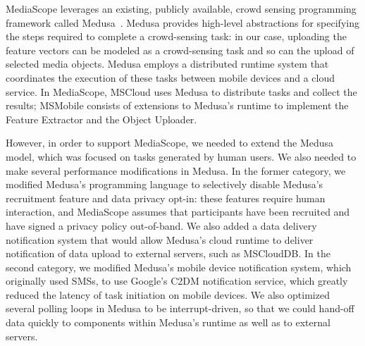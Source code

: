 MediaScope leverages an existing, publicly available, crowd sensing
programming framework called Medusa~\cite{Medusa}.
%
Medusa provides high-level abstractions for specifying the steps
required to complete a crowd-sensing task: in our case, uploading the
feature vectors can be modeled as a crowd-sensing task and so can the
upload of selected media objects.
%
Medusa employs a distributed runtime system that coordinates the
execution of these tasks between mobile devices and a cloud service.
%
In MediaScope, MSCloud uses Medusa to distribute tasks and collect the
results; MSMobile consists of extensions to Medusa's runtime to
implement the Feature Extractor and the Object Uploader.
%

However, in order to support MediaScope, we needed to extend the
Medusa model, which was focused on tasks generated by human users.
%
We also needed to make several performance modifications in Medusa.
%
In the former category, we modified Medusa's programming language to
selectively disable Medusa's recruitment feature and data privacy
opt-in: these features require human interaction, and
MediaScope assumes that participants have been recruited and have
signed a privacy policy out-of-band.
%
We also added a data delivery notification system that
would allow Medusa's cloud runtime to deliver notification of data
upload to external servers, such as MSCloudDB.
%
In the second category, we modified Medusa's mobile device
notification system, which originally used SMSs, to use Google's C2DM
notification service, which greatly reduced the latency of task
initiation on mobile devices.
%
We also optimized several polling loops in Medusa to be
interrupt-driven, so that we could hand-off data quickly to components
within Medusa's runtime as well as to external servers.


